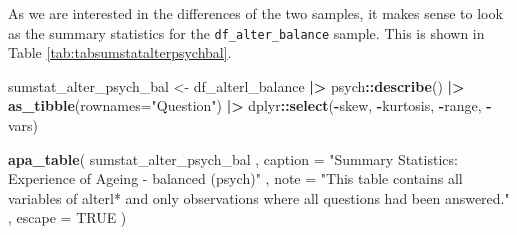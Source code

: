 \documentclass[
  doc]{apa6}
\newenvironment{Shaded}{\begin{snugshade}}{\end{snugshade}}
\newcommand{\AttributeTok}[1]{\textcolor[rgb]{0.13,0.29,0.53}{#1}}
\newcommand{\ConstantTok}[1]{\textcolor[rgb]{0.56,0.35,0.01}{#1}}
\newcommand{\FunctionTok}[1]{\textcolor[rgb]{0.13,0.29,0.53}{\textbf{#1}}}
\newcommand{\NormalTok}[1]{#1}
\newcommand{\OtherTok}[1]{\textcolor[rgb]{0.56,0.35,0.01}{#1}}
\newcommand{\SpecialCharTok}[1]{\textcolor[rgb]{0.81,0.36,0.00}{\textbf{#1}}}
\newcommand{\StringTok}[1]{\textcolor[rgb]{0.31,0.60,0.02}{#1}}
\begin{document}
As we are interested in the differences of the two samples, it makes sense to look as the summary statistics for the \texttt{df\_alter\_balance} sample. This is shown in Table \ref{tab:tabsumstatalterpsychbal}.

\begin{Shaded}
\begin{Highlighting}[]
\NormalTok{sumstat\_alter\_psych\_bal }\OtherTok{\textless{}{-}}\NormalTok{ df\_alterl\_balance }\SpecialCharTok{|\textgreater{}}
\NormalTok{  psych}\SpecialCharTok{::}\FunctionTok{describe}\NormalTok{() }\SpecialCharTok{|\textgreater{}} 
  \FunctionTok{as\_tibble}\NormalTok{(}\AttributeTok{rownames=}\StringTok{"Question"}\NormalTok{)  }\SpecialCharTok{|\textgreater{}} 
\NormalTok{  dplyr}\SpecialCharTok{::}\FunctionTok{select}\NormalTok{(}\SpecialCharTok{{-}}\NormalTok{skew, }\SpecialCharTok{{-}}\NormalTok{kurtosis, }\SpecialCharTok{{-}}\NormalTok{range, }\SpecialCharTok{{-}}\NormalTok{vars) }

\FunctionTok{apa\_table}\NormalTok{(}
\NormalTok{  sumstat\_alter\_psych\_bal}
\NormalTok{  , }\AttributeTok{caption =} \StringTok{"Summary Statistics: Experience of Ageing {-} balanced (psych)"}
\NormalTok{  , }\AttributeTok{note =} \StringTok{"This table contains all variables of \textasciigrave{}alterl*\textasciigrave{} and only observations where all questions had been answered."}
\NormalTok{  , }\AttributeTok{escape =} \ConstantTok{TRUE}
\NormalTok{)}
\end{Highlighting}
\end{Shaded}
\end{document}
